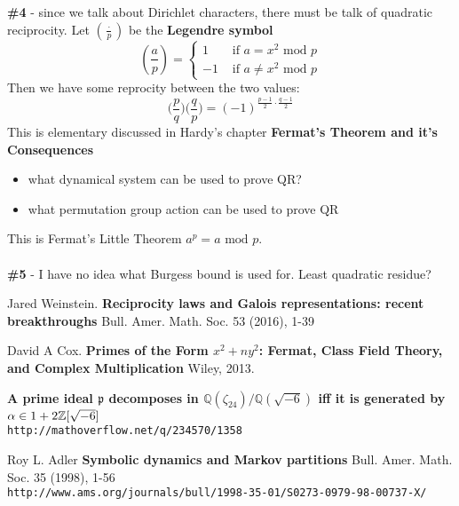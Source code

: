 \documentclass[12pt]{article}
\begin{document}
\newpage

\noindent \textbf{\#4} - since we talk about Dirichlet characters, there must be talk of quadratic reciprocity.  Let $(\frac{\cdot}{p})$ be the \textbf{Legendre symbol}
$$ 
\left(\frac{a}{p}\right)
= \left\{  \begin{array}{rc} 
1 & \text{ if }a = x^2 \text{ mod }p\\
-1 & \text{ if }a \neq x^2 \text{ mod }p
 \end{array}\right.
 $$
 Then we have some reprocity between the two values:
 $$ 
 \big(\frac{p}{q}\big)\big(\frac{q}{p}\big)= (-1)^{\frac{p-1}{2}\cdot \frac{q-1}{2}}
 $$
 This is elementary discussed in Hardy's chapter \textbf{Fermat's Theorem and it's Consequences}
 \begin{itemize}
 \item what dynamical system can be used to prove QR?
 \item what permutation group action can be used to prove QR
 \end{itemize}
This is Fermat's Little Theorem $a^p = a \text{ mod }p$. \\ \\
\textbf{\#5} - I have no idea what Burgess bound is used for.  Least quadratic residue?

\newpage

\selectfont \fontsize{12}{10}\selectfont


\begin{thebibliography}{}

\item Jared Weinstein. \textbf{Reciprocity laws and Galois representations: recent breakthroughs} Bull. Amer. Math. Soc. 53 (2016), 1-39 

\item David A Cox. \textbf{Primes of the Form $x^2+ny^2$: Fermat, Class Field Theory, and Complex Multiplication} Wiley, 2013.

\item \textbf{A prime ideal $\mathfrak{p}$ decomposes in $\mathbb{Q}(\zeta_{24})/\mathbb{Q}(\sqrt{-6})$ iff it is generated by $\alpha\in1+2\Bbb{Z}[\sqrt{-6}]$} \\ \texttt{http://mathoverflow.net/q/234570/1358}

\item Roy L. Adler \textbf{Symbolic dynamics and Markov partitions}  Bull. Amer. Math. Soc. 35 (1998), 1-56  \\ \texttt{http://www.ams.org/journals/bull/1998-35-01/S0273-0979-98-00737-X/}


\end{thebibliography}
\end{document}

